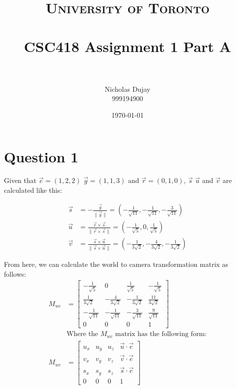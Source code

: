 \documentclass{article} %
\title{
\normalfont \normalsize
\textsc{University of Toronto} \\ [25pt] %
\horrule{0.5pt} \\[0.4cm] %
\huge CSC418 Assignment 1 Part A \\ %
\horrule{2pt} \\[0.5cm] %
}
\author{Nicholas Dujay\\999194900} %
\date{\normalsize\today} %
\begin{document}
\maketitle %


\section{Question 1}
Given that $\vec{e} = (1,2,2)$ $\vec{g} =(1,1,3)$ and $\vec{r}=(0,1,0)$, $\vec{s}$ $\vec{u}$ and $\vec{v}$ are calculated like this:

\begin{align*}
\vec{s}&=-\frac{\vec{g}}{\| \vec{g} \|} = \left(-\frac{1}{\sqrt{11}},-\frac{1}{\sqrt{11}},-\frac{3}{\sqrt{11}} \right) \\
\vec{u}&=\frac{\vec{r} \times \vec{s}}{\|\vec{r} \times \vec{s}\|} = \left(-\frac{1}{\sqrt{5}},0,\frac{1}{\sqrt{5}} \right)\\
\vec{v}&=\frac{\vec{s} \times \vec{u}}{\|\vec{s} \times \vec{u}\|} = \left(-\frac{1}{3\sqrt{2}},-\frac{4}{3\sqrt{2}},-\frac{1}{3\sqrt{2}} \right)
\end{align*}

From here, we can calculate the world to camera transformation matrix as follows:
\begin{align*}
M_{wc} &= \left[
\begin{array}{ccc|c}
-\frac{1}{\sqrt{5}} & 0 & \frac{1}{\sqrt{5}} & -\frac{1}{\sqrt{5}}\\
\frac{1}{3\sqrt{2}} & -\frac{4}{3\sqrt{2}} & -\frac{1}{3\sqrt{2}} & \frac{11}{3\sqrt{2}}\\
-\frac{1}{\sqrt{11}} & -\frac{1}{\sqrt{11}} & -\frac{3}{\sqrt{11}} & \frac{9}{\sqrt{11}}\\
0 & 0 & 0 & 1
\end{array}
\right]\\
&\text{Where the $M_{wc}$ matrix has the following form:}\\
M_{wc} &= \left[
\begin{array}{ccc|c}
u_x & u_y & u_z & \vec{u} \cdot \vec{e} \\
v_x & v_y & v_z & \vec{v} \cdot \vec{e} \\
s_x & s_y & s_z & \vec{s} \cdot \vec{e} \\
0 & 0 & 0 & 1
\end{array}
\right]
\end{align*}
\end{document}

